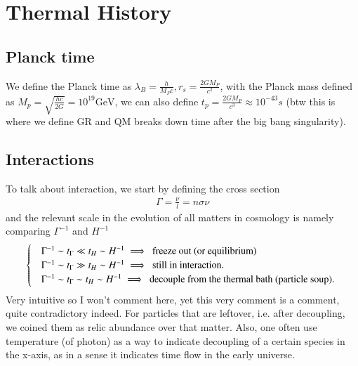 \documentclass[a4paper, 12pt]{article}
\begin{document}
{\section{Thermal History}
  \subsection{Planck time}%
    \label{sub:Planck time}
     We define the Planck time as \( \lambda_B = \frac{h}{M_{P} c}, r_s
     = \frac{2GM_P}{c^2} \), with the Planck mass defined as \( M_p =
     \sqrt{ \frac{hc}{2G} } = 10^{19} \mathrm{GeV}  \), we can also
     define \( t_p = \frac{2GM_P}{c^3} ≈ 10^{-43}s \) (btw this is
     where we define GR and QM breaks down time after the big bang
     singularity).  



  \subsection{Interactions}
    To talk about interaction, we start by defining the cross section 
    \begin{align}
      \label{cross section}
      \Gamma = \frac{\nu}{l} = n \sigma \nu
    \end{align}
    and the relevant scale in the evolution of all matters in
    cosmology is namely comparing \( \Gamma^{-1}   \) and \( H^{-1}  \) 
    \begin{align}
      \label{relevant cross section scale in cosmology}
      \begin{cases} 
        &\Gamma^{-1} \sim t_{\Gamma} \ll t_{H} \sim  H^{-1} \implies
      \textnormal{ freeze out (or equilibrium) } \\ 
        &\Gamma^{-1} \sim t_{\Gamma} \gg t_{H} \sim  H^{-1} \implies
        \textnormal{ still in interaction. } \\
         &\Gamma^{-1} \sim t_{\Gamma} \sim t_{H} \sim  H^{-1}
         \implies \textnormal{ decouple from the thermal bath
         (particle soup). }
      \end{cases}   
          \end{align}
    Very intuitive so I won't comment here, yet this very comment is a
    comment, quite contradictory indeed.
    For particles that are leftover, i.e. after decoupling, we coined
    them as relic abundance over that matter. Also, one often use
    temperature (of photon) as a way to indicate decoupling of a certain
    species in the x-axis, as in a sense it indicates time flow in the
    early universe.

}
\end{document}
